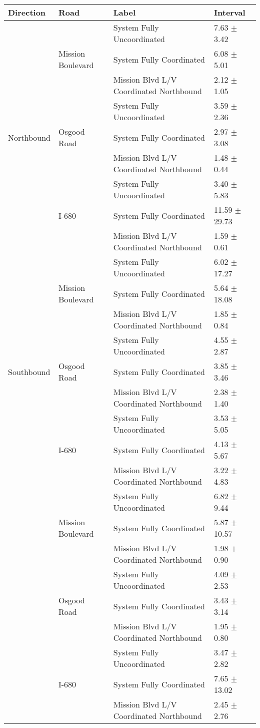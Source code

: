 \begin{tabular}{llll}
\toprule
Direction & Road & Label & Interval \\
\midrule
\multirow[t]{9}{*}{Northbound} & \multirow[t]{3}{*}{Mission Boulevard} & System Fully Uncoordinated & 7.63 $\pm$ 3.42 \\
 &  & System Fully Coordinated & 6.08 $\pm$ 5.01 \\
 &  & Mission Blvd L/V Coordinated Northbound & 2.12 $\pm$ 1.05 \\
 & \multirow[t]{3}{*}{Osgood Road} & System Fully Uncoordinated & 3.59 $\pm$ 2.36 \\
 &  & System Fully Coordinated & 2.97 $\pm$ 3.08 \\
 &  & Mission Blvd L/V Coordinated Northbound & 1.48 $\pm$ 0.44 \\
 & \multirow[t]{3}{*}{I-680} & System Fully Uncoordinated & 3.40 $\pm$ 5.83 \\
 &  & System Fully Coordinated & 11.59 $\pm$ 29.73 \\
 &  & Mission Blvd L/V Coordinated Northbound & 1.59 $\pm$ 0.61 \\
\multirow[t]{9}{*}{Southbound} & \multirow[t]{3}{*}{Mission Boulevard} & System Fully Uncoordinated & 6.02 $\pm$ 17.27 \\
 &  & System Fully Coordinated & 5.64 $\pm$ 18.08 \\
 &  & Mission Blvd L/V Coordinated Northbound & 1.85 $\pm$ 0.84 \\
 & \multirow[t]{3}{*}{Osgood Road} & System Fully Uncoordinated & 4.55 $\pm$ 2.87 \\
 &  & System Fully Coordinated & 3.85 $\pm$ 3.46 \\
 &  & Mission Blvd L/V Coordinated Northbound & 2.38 $\pm$ 1.40 \\
 & \multirow[t]{3}{*}{I-680} & System Fully Uncoordinated & 3.53 $\pm$ 5.05 \\
 &  & System Fully Coordinated & 4.13 $\pm$ 5.67 \\
 &  & Mission Blvd L/V Coordinated Northbound & 3.22 $\pm$ 4.83 \\
\multirow[t]{9}{*}{} & \multirow[t]{3}{*}{Mission Boulevard} & System Fully Uncoordinated & 6.82 $\pm$ 9.44 \\
 &  & System Fully Coordinated & 5.87 $\pm$ 10.57 \\
 &  & Mission Blvd L/V Coordinated Northbound & 1.98 $\pm$ 0.90 \\
 & \multirow[t]{3}{*}{Osgood Road} & System Fully Uncoordinated & 4.09 $\pm$ 2.53 \\
 &  & System Fully Coordinated & 3.43 $\pm$ 3.14 \\
 &  & Mission Blvd L/V Coordinated Northbound & 1.95 $\pm$ 0.80 \\
 & \multirow[t]{3}{*}{I-680} & System Fully Uncoordinated & 3.47 $\pm$ 2.82 \\
 &  & System Fully Coordinated & 7.65 $\pm$ 13.02 \\
 &  & Mission Blvd L/V Coordinated Northbound & 2.45 $\pm$ 2.76 \\
\bottomrule
\end{tabular}
